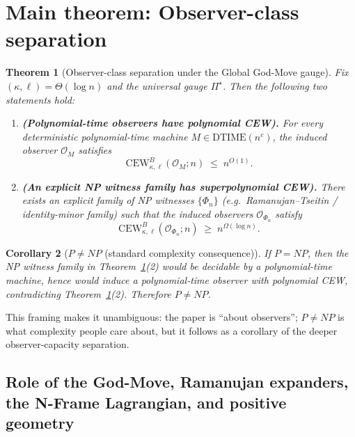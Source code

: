 \documentclass[12pt]{article}
\newtheorem{theorem}{Theorem}
\newtheorem{corollary}[theorem]{Corollary}
\theoremstyle{definition}
\theoremstyle{definition}
\theoremstyle{remark}
\theoremstyle{remark}
\begin{document}

\section{Main theorem: Observer-class separation}
\label{sec:main-observer-separation}

\begin{theorem}[Observer-class separation under the Global God-Move gauge]
\label{thm:observer-separation}
Fix $(\kappa,\ell)=\Theta(\log n)$ and the universal gauge $\Pi^\star$.
Then the following two statements hold:
\begin{enumerate}
\item \textbf{(Polynomial-time observers have polynomial CEW).}
For every deterministic polynomial-time machine $M\in\mathrm{DTIME}(n^{c})$, the induced
observer $\mathcal{O}_M$ satisfies
\[
\mathrm{CEW}^{B}_{\kappa,\ell}(\mathcal{O}_M;n) \;\le\; n^{O(1)}.
\]
\item \textbf{(An explicit NP witness family has superpolynomial CEW).}
There exists an explicit family of NP witnesses $\{\Phi_n\}$ (e.g.\ Ramanujan--Tseitin /
identity-minor family) such that the induced observers $\mathcal{O}_{\Phi_n}$ satisfy
\[
\mathrm{CEW}^{B}_{\kappa,\ell}(\mathcal{O}_{\Phi_n};n) \;\ge\; n^{\Omega(\log n)}.
\]
\end{enumerate}
\end{theorem}

\begin{corollary}[$P\neq NP$ (standard complexity consequence)]
\label{cor:p-neq-np-from-observers}
If $P=NP$, then the NP witness family in Theorem~\ref{thm:observer-separation}(2) would be
decidable by a polynomial-time machine, hence would induce a polynomial-time observer with
polynomial CEW, contradicting Theorem~\ref{thm:observer-separation}(2).
Therefore $P\neq NP$.
\end{corollary}

This framing makes it unambiguous: the paper is ``about observers''; $P\neq NP$ is what complexity people care about, but it follows as a corollary of the deeper observer-capacity separation.

\subsection{Role of the God-Move, Ramanujan expanders, the N-Frame Lagrangian, and positive geometry}
\label{subsec:role-of-structures}
\end{document}
